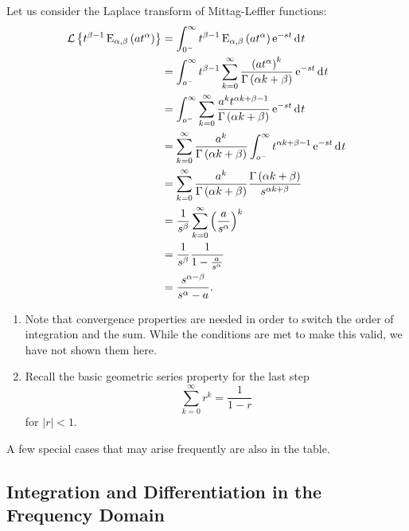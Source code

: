     Let us consider the Laplace transform of Mittag-Leffler functions:
    \begin{align*}
      \mathcal L \left\{ t^{\beta-1} \operatorname{E}_{\alpha,\beta}\left( a t^\alpha \right) \right\} &= \int_{0^-}^\infty t^{\beta-1} \operatorname{E}_{\alpha,\beta}\left( a t^\alpha \right) \operatorname{e}^{-s t} \operatorname{d}\hspace*{-1pt} t \\
      &= \int_{o^-}^\infty t^{\beta - 1} \sum_{k=0}^\infty \frac{\left( a t^\alpha \right)^k}{\Gamma \left( \alpha k + \beta \right)} \operatorname{e}^{-s t} \operatorname{d}\hspace*{-1pt} t \\
      &= \int_{o^-}^\infty \sum_{k=0}^\infty \frac{ a^k t^{\alpha k + \beta - 1} }{\Gamma \left( \alpha k + \beta \right)} \operatorname{e}^{-s t} \operatorname{d}\hspace*{-1pt} t \\
	&= \sum_{k=0}^\infty \frac{ a^k }{\Gamma \left( \alpha k + \beta \right)} \int_{o^-}^\infty t^{\alpha k + \beta - 1} \operatorname{e}^{-s t} \operatorname{d}\hspace*{-1pt} t \\
	&= \sum_{k=0}^\infty \frac{a^k}{\Gamma \left( \alpha k + \beta \right)} \frac{\Gamma \left( \alpha k + \beta \right) }{s^{\alpha k + \beta}} \\
	&= \frac{1}{s^\beta} \sum_{k=0}^\infty \left( \frac{a}{s^\alpha} \right)^k \\
	&= \frac{1}{s^\beta} \frac{1}{1 - \frac{a}{s^\alpha}} \\
	&= \frac{s^{\alpha - \beta}}{s^\alpha - a}.
    \end{align*}

    \begin{remark} 
      \hspace*{1em}
      \begin{enumerate}
	\item Note that convergence properties are needed in order to switch the order of integration and the sum. While the conditions are met to make this valid, we have not shown them here.
	\item Recall the basic geometric series property for the last step
	  \begin{equation*}
	    \sum_{k=0}^\infty r^k = \frac{1}{1 - r}
	  \end{equation*}
	  for $\left| r \right| < 1$.
      \end{enumerate}
    \end{remark}
    A few special cases that may arise frequently are also in the table.

    \subsection{Integration and Differentiation in the Frequency Domain}

